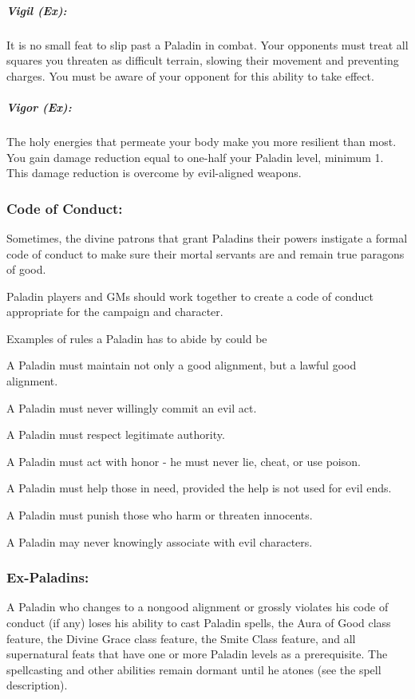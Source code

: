 \subparagraph{Vigil (Ex):}
It is no small feat to slip past a Paladin in combat. Your opponents must treat all squares you threaten as difficult terrain, slowing their movement and preventing charges. You must be aware of your opponent for this ability to take effect.

\subparagraph{Vigor (Ex):}
The holy energies that permeate your body make you more resilient than most. You gain damage reduction equal to one-half your Paladin level, minimum 1. This damage reduction is overcome by evil-aligned weapons.

\subsubsection{Code of Conduct:}
Sometimes, the divine patrons that grant Paladins their powers instigate a formal code of conduct to make sure their mortal servants are and remain true paragons of good.

Paladin players and GMs should work together to create a code of conduct appropriate for the campaign and character.

Examples of rules a Paladin has to abide by could be
\begin{list}{}{\leftmargin=1em}
 \item A Paladin must maintain not only a good alignment, but a lawful good alignment.
 \item A Paladin must never willingly commit an evil act.
 \item A Paladin must respect legitimate authority.
 \item A Paladin must act with honor - he must never lie, cheat, or use poison.
 \item A Paladin must help those in need, provided the help is not used for evil ends.
 \item A Paladin must punish those who harm or threaten innocents.
 \item A Paladin may never knowingly associate with evil characters.
\end{list}
\subsubsection{Ex-Paladins:}
A Paladin who changes to a nongood alignment or grossly violates his code of conduct (if any) loses his ability to cast Paladin spells, the Aura of Good class feature, the Divine Grace class feature, the Smite Class feature, and all supernatural feats that have one or more Paladin levels as a prerequisite.
The spellcasting and other abilities remain dormant until he atones (see the  spell description).

